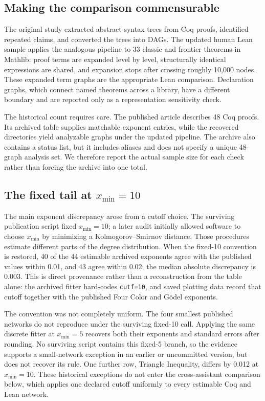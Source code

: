 \documentclass[11pt]{article}
\begin{document}
\subsection{Making the comparison commensurable}

The original study extracted abstract-syntax trees from Coq proofs, identified repeated claims, and
converted the trees into DAGs.  The updated human Lean sample applies the analogous pipeline to 33
classic and frontier theorems in Mathlib: proof terms are expanded level by level, structurally
identical expressions are shared, and expansion stops after crossing roughly 10,000 nodes.  These
expanded term graphs are the appropriate Lean comparison.  Declaration graphs, which connect named
theorems across a library, have a different boundary and are reported only as a representation
sensitivity check.

The historical count requires care.  The published article describes 48 Coq proofs.  Its archived
table supplies \PublishedCoqN{} matchable exponent entries, while the recovered directories yield
\RecoveredCoqN{} analyzable graphs under the updated pipeline.  The archive also contains a status
list, but it includes aliases and does not specify a unique 48-graph analysis set.  We therefore
report the actual sample size for each check rather than forcing the archive into one total.

\subsection{The fixed tail at \texorpdfstring{$x_{\min}=10$}{xmin = 10}}

The main exponent discrepancy arose from a cutoff choice.  The surviving publication script fixed
$x_{\min}=10$; a later audit initially allowed software to choose $x_{\min}$ by minimizing a
Kolmogorov--Smirnov distance.  Those procedures estimate different parts of the degree distribution.
When the fixed-10 convention is restored, 40 of the 44 estimable archived exponents agree with the
published values within 0.01, and 43 agree within 0.02; the median absolute discrepancy is 0.003.
This is direct provenance rather than a reconstruction from the table alone: the archived fitter
hard-codes \texttt{cutf=10}, and saved plotting data record that cutoff together with the published
Four Color and G\"odel exponents.

The convention was not completely uniform.  The four smallest published networks do not reproduce
under the surviving fixed-10 call.  Applying the same discrete fitter at $x_{\min}=5$ recovers both
their exponents and standard errors after rounding.  No surviving script contains this fixed-5
branch, so the evidence supports a small-network exception in an earlier or uncommitted version,
but does not recover its rule.  One further row, Triangle Inequality, differs by 0.012 at
$x_{\min}=10$.  These historical exceptions do not enter the cross-assistant comparison below,
which applies one declared cutoff uniformly to every estimable Coq and Lean network.
\end{document}
